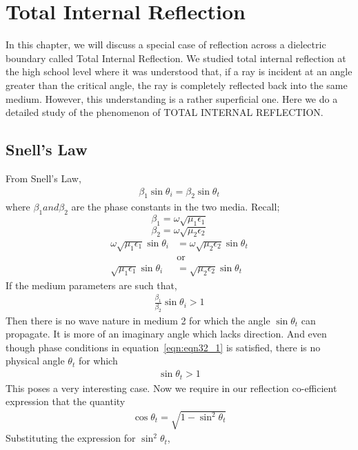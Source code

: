 \chapter{Total Internal Reflection}\label{lec:lec32}

In this chapter, we will discuss a special case of reflection across a dielectric boundary called Total Internal Reflection. We studied total internal reflection at the high school level where it was understood that, if a ray is incident at an angle greater than the critical angle, the ray is completely reflected back into the same medium. However, this understanding is a rather superficial one. Here we do a detailed study of the phenomenon of TOTAL INTERNAL REFLECTION.

\section{Snell's Law}
From Snell's Law,
\begin{align}
\beta_1 \sin\theta_i = \beta_2 \sin\theta_t
\label{eqn:eqn32_1}
\end{align}
where $\beta_1 and \beta_2$ are the phase constants in the two media. Recall;
$$ \beta_{1} = \omega\sqrt{\mu_{1}\epsilon_{1}}$$
$$ \beta_{2} = \omega\sqrt{\mu_{2}\epsilon_{2}}$$
\begin{align*}
\omega\sqrt{\mu_1\epsilon_{1}} \sin\theta_i &= \omega\sqrt{\mu_2\epsilon_2}  \sin\theta_t\\
&\text{or}\\
\sqrt{\mu_1\epsilon_{1}} \sin\theta_i &= \sqrt{\mu_2\epsilon_2}  \sin\theta_t
\end{align*}
If the medium parameters are such that,
\begin{align}
\frac{\beta_1}{\beta_2}\sin\theta_i > 1
\end{align}
Then there is no wave nature in medium 2 for which the angle $\sin\theta_t$ can propagate. It is more of an imaginary angle which lacks direction. And even though phase conditions in equation~\ref{eqn:eqn32_1} is satisfied, there is no physical angle $\theta_t$ for which
\begin{align}
\sin\theta_t > 1
\label{eqn:eqn32_3}
\end{align}
This poses a very interesting case. Now we require in our reflection co-efficient expression that the quantity
\begin{align}
\cos\theta_t = \sqrt{1-\sin^2\theta_t}
\end{align}
Substituting the expression for $\sin^{2}\theta_{t}$,
